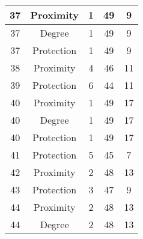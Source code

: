 \documentclass[results.tex]{subfiles}
\begin{document}
\begin{center}
\begin{tabular}{| c || c | c | c | c |}
            \hline
            37                      & Proximity                    & 1                      & 49                      & 9                    \\
            \hline
            37                      & Degree                       & 1                      & 49                      & 9                    \\
            \hline
            37                      & Protection                   & 1                      & 49                      & 9                    \\
            \hline
            38                      & Proximity                    & 4                      & 46                      & 11                   \\
            \hline
            39                      & Protection                   & 6                      & 44                      & 11                   \\
            \hline
            40                      & Proximity                    & 1                      & 49                      & 17                   \\
            \hline
            40                      & Degree                       & 1                      & 49                      & 17                   \\
            \hline
            40                      & Protection                   & 1                      & 49                      & 17                   \\
            \hline
            41                      & Protection                   & 5                      & 45                      & 7                    \\
            \hline
            42                      & Proximity                    & 2                      & 48                      & 13                   \\
            \hline
            43                      & Protection                   & 3                      & 47                      & 9                    \\
            \hline
            44                      & Proximity                    & 2                      & 48                      & 13                   \\
            \hline
            44                      & Degree                       & 2                      & 48                      & 13                   \\

\end{tabular}
\end{center}
\end{document}
